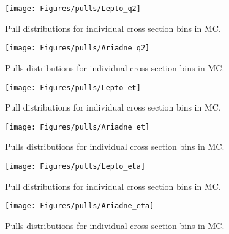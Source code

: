 \begin{figure}[p!]
	\centering
		\texttt{[image: Figures/pulls/Lepto\_q2]}
	\caption{Pull distributions for individual \dsdqsq cross section bins in \lepto MC.}
	\label{fig:q2_pulls_ari}
\end{figure}

\begin{figure}[p!]
	\centering
		\texttt{[image: Figures/pulls/Ariadne\_q2]}
	\caption{Pulls distributions for individual \dsdqsq cross section bins in \ariadne MC.}
	\label{fig:q2_pulls_ari}
\end{figure}

\begin{figure}[p!]
	\centering
		\texttt{[image: Figures/pulls/Lepto\_et]}
	\caption{Pull distributions for individual \dsdqsq cross section bins in \lepto MC.}
	\label{fig:et_pulls_lep}
\end{figure}

\begin{figure}[p!]
	\centering
		\texttt{[image: Figures/pulls/Ariadne\_et]}
	\caption{Pulls distributions for individual \dsdetjetb cross section bins in \ariadne MC.}
	\label{fig:et_pulls_ari}
\end{figure}

\begin{figure}[p!]
	\centering
		\texttt{[image: Figures/pulls/Lepto\_eta]}
	\caption{Pull distributions for individual \dsdetajetb cross section bins in \lepto MC.}
	\label{fig:eta_pulls_lep}
\end{figure}

\begin{figure}[p!]
	\centering
		\texttt{[image: Figures/pulls/Ariadne\_eta]}
	\caption{Pulls distributions for individual \dsdetajetb cross section bins in \ariadne MC.}
	\label{fig:eta_pulls_ari}
\end{figure}